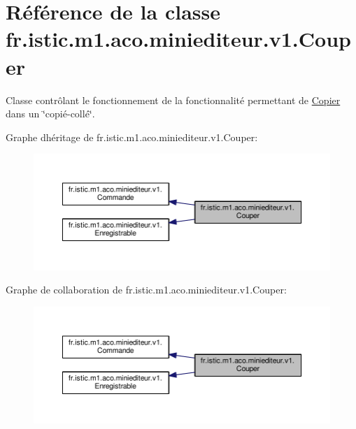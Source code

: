 \hypertarget{classfr_1_1istic_1_1m1_1_1aco_1_1miniediteur_1_1v1_1_1Couper}{}\section{Référence de la classe fr.\+istic.\+m1.\+aco.\+miniediteur.\+v1.\+Couper}
\label{classfr_1_1istic_1_1m1_1_1aco_1_1miniediteur_1_1v1_1_1Couper}


Classe contrôlant le fonctionnement de la fonctionnalité permettant de \hyperlink{classfr_1_1istic_1_1m1_1_1aco_1_1miniediteur_1_1v1_1_1Copier}{Copier} dans un \char`\"{}copié-\/collé\char`\"{}.  




Graphe d\textquotesingle{}héritage de fr.\+istic.\+m1.\+aco.\+miniediteur.\+v1.\+Couper\+:
\nopagebreak
\begin{figure}[H]
\begin{center}
\leavevmode
\includegraphics[width=350pt]{classfr_1_1istic_1_1m1_1_1aco_1_1miniediteur_1_1v1_1_1Couper__inherit__graph}
\end{center}
\end{figure}


Graphe de collaboration de fr.\+istic.\+m1.\+aco.\+miniediteur.\+v1.\+Couper\+:
\nopagebreak
\begin{figure}[H]
\begin{center}
\leavevmode
\includegraphics[width=350pt]{classfr_1_1istic_1_1m1_1_1aco_1_1miniediteur_1_1v1_1_1Couper__coll__graph}
\end{center}
\end{figure}
